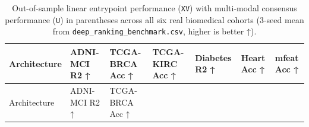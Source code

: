 \documentclass[
  10pt,
  letterpaper,
]{report}
\begin{document}
\begin{longtable}[]{@{}
  >{\raggedright\arraybackslash}p{}
  >{\raggedleft\arraybackslash}p{}
  >{\raggedleft\arraybackslash}p{}
  >{\raggedleft\arraybackslash}p{}
  >{\raggedleft\arraybackslash}p{}
  >{\raggedleft\arraybackslash}p{}
  >{\raggedleft\arraybackslash}p{}@{}}
\caption{Out-of-sample linear entrypoint performance
(\protect\texttt{XV}) with multi-modal consensus performance
(\protect\texttt{U}) in parentheses across all six real biomedical
cohorts (3-seed mean from \protect\texttt{deep\_ranking\_benchmark.csv},
higher is better ↑).}\label{tbl-real-cohorts-summary}\tabularnewline
\toprule\noalign{}
\begin{minipage}[b]{\linewidth}\raggedright
Architecture
\end{minipage} & \begin{minipage}[b]{\linewidth}\raggedleft
ADNI-MCI R2 ↑
\end{minipage} & \begin{minipage}[b]{\linewidth}\raggedleft
TCGA-BRCA Acc ↑
\end{minipage} & \begin{minipage}[b]{\linewidth}\raggedleft
TCGA-KIRC Acc ↑
\end{minipage} & \begin{minipage}[b]{\linewidth}\raggedleft
Diabetes R2 ↑
\end{minipage} & \begin{minipage}[b]{\linewidth}\raggedleft
Heart Acc ↑
\end{minipage} & \begin{minipage}[b]{\linewidth}\raggedleft
mfeat Acc ↑
\end{minipage} \\
\midrule\noalign{}
\endfirsthead
\toprule\noalign{}
\begin{minipage}[b]{\linewidth}\raggedright
Architecture
\end{minipage} & \begin{minipage}[b]{\linewidth}\raggedleft
ADNI-MCI R2 ↑
\end{minipage} & \begin{minipage}[b]{\linewidth}\raggedleft
TCGA-BRCA Acc ↑
\end{minipage} & \begin{minipage}[b]{\linewidth}\raggedleft

\end{minipage}
\end{longtable}
\end{document}
